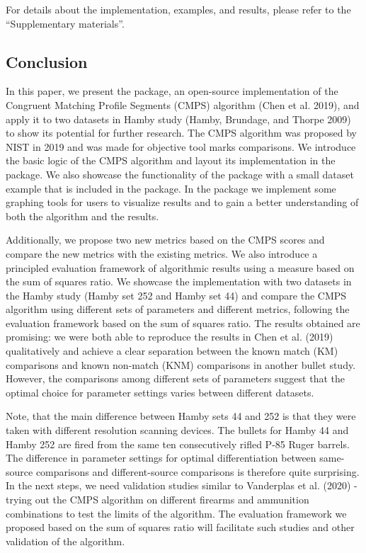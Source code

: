 For details about the implementation, examples, and results, please refer to the ``Supplementary materials''.

\hypertarget{conclusion}{%
\subsection{Conclusion}\label{conclusion}}

In this paper, we present the  package, an open-source implementation of the Congruent Matching Profile Segments (CMPS) algorithm (Chen et al. 2019), and apply it to two datasets in Hamby study (Hamby, Brundage, and Thorpe 2009) to show its potential for further research.
The CMPS algorithm was proposed by NIST in 2019 and was made for objective tool marks comparisons.
We introduce the basic logic of the CMPS algorithm and layout its implementation in the  package.
We also showcase the functionality of the  package with a small dataset example that is included in the package.
In the  package we implement some graphing tools for users to visualize results and to gain a better understanding of both the algorithm and the results.

Additionally, we propose two new metrics based on the CMPS scores and compare the new metrics with the existing metrics.
We also introduce a principled evaluation framework of algorithmic results using a measure based on the sum of squares ratio.
We showcase the implementation with two datasets in the Hamby study (Hamby set 252 and Hamby set 44) and compare the CMPS algorithm using different sets of parameters and different metrics, following the evaluation framework based on the sum of squares ratio.
The results obtained are promising: we were both able to reproduce the results in Chen et al. (2019) qualitatively and achieve a clear separation between the known match (KM) comparisons and known non-match (KNM) comparisons in another bullet study.
However, the comparisons among different sets of parameters suggest that the optimal choice for parameter settings varies between different datasets.

Note, that the main difference between Hamby sets 44 and 252 is that they were taken with different resolution scanning devices. The bullets for Hamby 44 and Hamby 252 are fired from the same ten consecutively rifled P-85 Ruger barrels. The difference in parameter settings for optimal differentiation between same-source comparisons and different-source comparisons is therefore quite surprising. In the next steps, we need validation studies similar to Vanderplas et al. (2020) - trying out the CMPS algorithm on different firearms and ammunition combinations to test the limits of the algorithm. The evaluation framework we proposed based on the sum of squares ratio will facilitate such studies and other validation of the algorithm.

